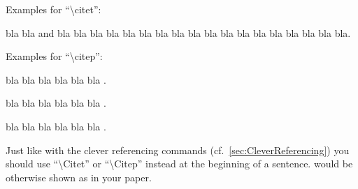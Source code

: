 Examples for ``\textbackslash{}citet'':

bla bla \citet{Hensher_2001} 
and \citet{GaerlingAxhausen_Transportation_2003}
bla bla bla bla bla bla bla bla bla bla
\citet{BowmanEtAl_WTR_1999,VovshaEtAl_TRR_2002,JonnalagaddaEtAl_TRR_2001,BhatEtAl_TRR_2004,Axhausen_Jones_1990}
bla bla bla bla bla bla bla bla.

Examples for ``\textbackslash{}citep'':

bla bla bla bla bla bla
\citep[e.g.,][]{Sheffi_1985,OrtuzarWillumsen_2001,OrtuzarWillumsen_2011}.

bla bla bla bla bla bla \citep[see also][pp.\
325-378]{Wardrop_PICE_1952}.

bla bla bla bla bla bla \citep{Wardrop_PICE_1952}.

Just like with the clever referencing commands (cf.~\cref{sec:CleverReferencing})
you should use ``\textbackslash{}Citet'' or ``\textbackslash{}Citep'' instead
at the beginning of a sentence.
would be otherwise shown as
\citet{DeJongEtAl_ResRep_AVV_2005}
in your paper.
